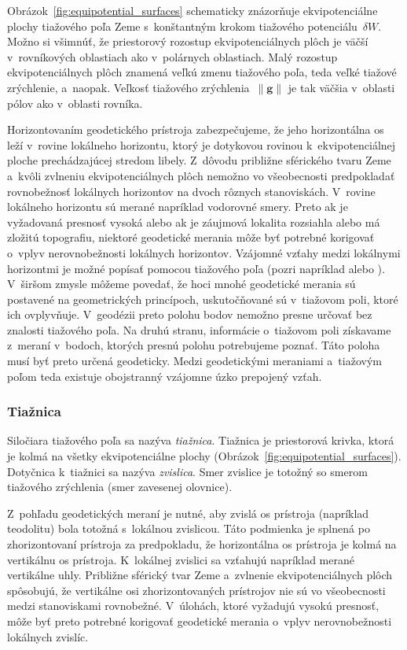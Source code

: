 \documentclass[a4paper, 12pt]{book}
\let\vec\mathbf
\begin{document}
Obrázok~\ref{fig:equipotential_surfaces} schematicky znázorňuje ekvipotenciálne 
plochy tiažového poľa Zeme s~konštantným krokom tiažového potenciálu~$\delta 
W$.  Možno si všimnúť, že priestorový rozostup ekvipotenciálnych plôch je väčší 
v~rovníkových oblastiach ako v~polárnych oblastiach.  Malý rozostup 
ekvipotenciálnych plôch znamená veľkú zmenu tiažového poľa, teda veľké tiažové 
zrýchlenie, a~naopak.  Veľkosť tiažového zrýchlenia~$\| \vec g \|$ je tak 
väčšia v~oblasti pólov ako v~oblasti rovníka.

Horizontovaním geodetického prístroja zabezpečujeme, že jeho horizontálna os 
leží v~rovine lokálneho horizontu, ktorý je dotykovou rovinou 
k~ekvipotenciálnej ploche prechádzajúcej stredom libely.  Z~dôvodu približne 
sférického tvaru Zeme a~kvôli zvlneniu ekvipotenciálnych plôch nemožno vo 
všeobecnosti predpokladať rovnobežnosť lokálnych horizontov na dvoch rôznych 
stanoviskách.  V~rovine lokálneho horizontu sú merané napríklad vodorovné 
smery.  Preto ak je vyžadovaná presnosť vysoká alebo ak je záujmová lokalita 
rozsiahla alebo má zložitú topografiu, niektoré geodetické merania môže byť 
potrebné korigovať o~vplyv nerovnobežnosti lokálnych horizontov.  Vzájomné 
vzťahy medzi lokálnymi horizontmi je možné popísať pomocou tiažového poľa 
(pozri napríklad \cite{VanicekGeodesy} alebo \cite{MoritzPhysicalGeodesy}).  
V~širšom zmysle môžeme povedať, že hoci mnohé geodetické merania sú postavené 
na geometrických princípoch, uskutočňované sú v~tiažovom poli, ktoré ich 
ovplyvňuje.  V~geodézii preto polohu bodov nemožno presne určovať bez znalosti 
tiažového poľa.  Na druhú stranu, informácie o~tiažovom poli získavame z~meraní 
v~bodoch, ktorých presnú polohu potrebujeme poznať.  Táto poloha musí byť preto 
určená geodeticky.  Medzi geodetickými meraniami a~tiažovým poľom teda existuje 
obojstranný vzájomne úzko prepojený vzťah.

\subsubsection{Tiažnica}
\label{sec:plumbline}

Siločiara tiažového poľa sa nazýva \emph{tiažnica}.  Tiažnica je priestorová 
krivka, ktorá je kolmá na všetky ekvipotenciálne plochy 
(Obrázok~\ref{fig:equipotential_surfaces}).  Dotyčnica k~tiažnici sa nazýva 
\emph{zvislica}.  Smer zvislice je totožný so smerom tiažového zrýchlenia (smer 
zavesenej olovnice).

Z~pohľadu geodetických meraní je nutné, aby zvislá os prístroja (napríklad 
teodolitu) bola totožná s~lokálnou zvislicou.  Táto podmienka je splnená po 
zhorizontovaní prístroja za predpokladu, že horizontálna os prístroja je kolmá 
na vertikálnu os prístroja.  K~lokálnej zvislici sa vzťahujú napríklad merané 
vertikálne uhly.  Približne sférický tvar Zeme a~zvlnenie ekvipotenciálnych 
plôch spôsobujú, že vertikálne osi zhorizontovaných prístrojov nie sú vo 
všeobecnosti medzi stanoviskami rovnobežné.  V~úlohách, ktoré vyžadujú vysokú 
presnosť, môže byť preto potrebné korigovať geodetické merania o~vplyv 
nerovnobežnosti lokálnych zvislíc.
\end{document}
